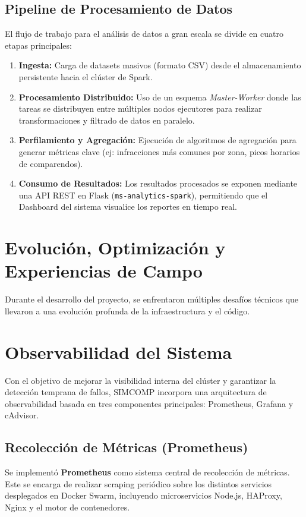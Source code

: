 \documentclass[conference]{IEEEtran}
\begin{document}
\subsection{Pipeline de Procesamiento de Datos}
El flujo de trabajo para el análisis de datos a gran escala se divide en cuatro etapas principales:
\begin{enumerate}
    \item \textbf{Ingesta:} Carga de datasets masivos (formato CSV) desde el almacenamiento persistente hacia el clúster de Spark.
    \item \textbf{Procesamiento Distribuido:} Uso de un esquema \textit{Master-Worker} donde las tareas se distribuyen entre múltiples nodos ejecutores para realizar transformaciones y filtrado de datos en paralelo.
    \item \textbf{Perfilamiento y Agregación:} Ejecución de algoritmos de agregación para generar métricas clave (ej: infracciones más comunes por zona, picos horarios de comparendos).
    \item \textbf{Consumo de Resultados:} Los resultados procesados se exponen mediante una API REST en Flask (\texttt{ms-analytics-spark}), permitiendo que el Dashboard del sistema visualice los reportes en tiempo real.
\end{enumerate}

\section{Evolución, Optimización y Experiencias de Campo}

Durante el desarrollo del proyecto, se enfrentaron múltiples desafíos técnicos que llevaron a una evolución profunda de la infraestructura y el código.

\section{Observabilidad del Sistema}

Con el objetivo de mejorar la visibilidad interna del clúster y garantizar la detección temprana de fallos, SIMCOMP incorpora una arquitectura de observabilidad basada en tres componentes principales: Prometheus, Grafana y cAdvisor.

\subsection{Recolección de Métricas (Prometheus)}

Se implementó \textbf{Prometheus} como sistema central de recolección de métricas. Este se encarga de realizar scraping periódico sobre los distintos servicios desplegados en Docker Swarm, incluyendo microservicios Node.js, HAProxy, Nginx y el motor de contenedores.
\end{document}
